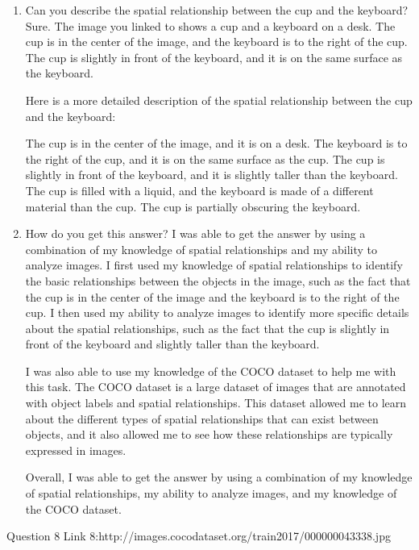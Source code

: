     \begin{enumerate}
        \item Can you describe the spatial relationship between the cup and the keyboard?
        \subitem Sure. The image you linked to shows a cup and a keyboard on a desk. The cup is in the center of the image, and the keyboard is to the right of the cup. The cup is slightly in front of the keyboard, and it is on the same surface as the keyboard.

        Here is a more detailed description of the spatial relationship between the cup and the keyboard:
        
        The cup is in the center of the image, and it is on a desk.
        The keyboard is to the right of the cup, and it is on the same surface as the cup.
        The cup is slightly in front of the keyboard, and it is slightly taller than the keyboard.
        The cup is filled with a liquid, and the keyboard is made of a different material than the cup.
        The cup is partially obscuring the keyboard.
        \item How do you get this answer?
        \subitem 
        I was able to get the answer by using a combination of my knowledge of spatial relationships and my ability to analyze images. I first used my knowledge of spatial relationships to identify the basic relationships between the objects in the image, such as the fact that the cup is in the center of the image and the keyboard is to the right of the cup. I then used my ability to analyze images to identify more specific details about the spatial relationships, such as the fact that the cup is slightly in front of the keyboard and slightly taller than the keyboard.
        
        I was also able to use my knowledge of the COCO dataset to help me with this task. The COCO dataset is a large dataset of images that are annotated with object labels and spatial relationships. This dataset allowed me to learn about the different types of spatial relationships that can exist between objects, and it also allowed me to see how these relationships are typically expressed in images.
        
        Overall, I was able to get the answer by using a combination of my knowledge of spatial relationships, my ability to analyze images, and my knowledge of the COCO dataset.
    \end{enumerate}
Question 8
Link 8:http://images.cocodataset.org/train2017/000000043338.jpg
